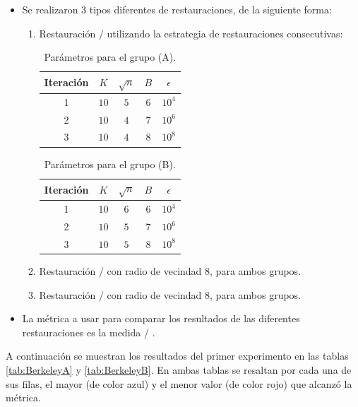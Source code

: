 \begin{itemize}
	\item Se realizaron 3 tipos diferentes de restauraciones, de la siguiente forma:
	\begin{enumerate}
		\item Restauraci\'on \SOP/ utilizando la estrategia de restauraciones consecutivas:
		\begin{table}[H]
			\centering
			\begin{tabular}{|c|cccc|}
				\hline
				Iteraci\'on & $K$ & $\sqrt{n}$ & $B$ & $\epsilon$ \\\hline
				1 & $10$ & $5$ & $6$ & $10^4$\\
				2 & $10$ & $4$ & $7$ & $10^6$\\
				3 & $10$ & $4$ & $8$ & $10^8$\\\hline
			\end{tabular}
			\caption{Par\'ametros para el grupo (A).}
		\end{table}
		\begin{table}[H]
			\centering
			\begin{tabular}{|c|cccc|}
				\hline
				Iteraci\'on & $K$ & $\sqrt{n}$ & $B$ & $\epsilon$ \\\hline
				1 & $10$ & $6$ & $6$ & $10^4$\\
				2 & $10$ & $5$ & $7$ & $10^6$\\
				3 & $10$ & $5$ & $8$ & $10^8$\\\hline
			\end{tabular}
			\caption{Par\'ametros para el grupo (B).}
		\end{table}
		\item Restauraci\'on \TELEA/ con radio de vecindad $8$, para ambos grupos.
		\item Restauraci\'on \NS/ con radio de vecindad $8$, para ambos grupos.
	\end{enumerate}
	\item La m\'etrica a usar para comparar los resultados de las diferentes restauraciones es la medida \PSNR/ \cite{enwiki:psnr}.
\end{itemize}



A continuaci\'on se muestran los resultados del primer experimento en las tablas \ref{tab:BerkeleyA} y \ref{tab:BerkeleyB}. En ambas tablas se resaltan por cada una de sus filas, el mayor (de color azul) y el menor valor (de color rojo) que alcanz\'o la m\'etrica.

